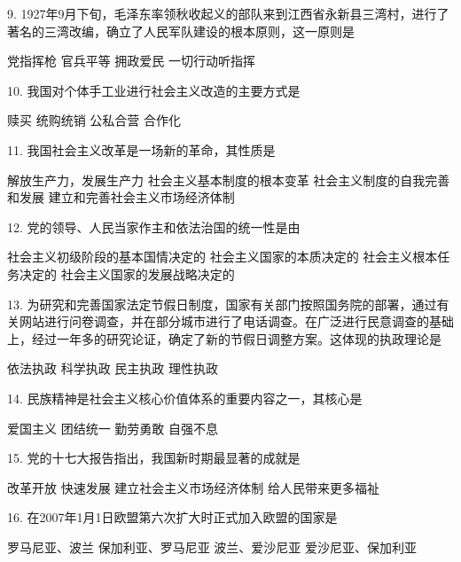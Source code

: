 9. 1927年9月下旬，毛泽东率领秋收起义的部队来到江西省永新县三湾村，进行了著名的三湾改编，确立了人民军队建设的根本原则，这一原则是
\begin{choices}
	 党指挥枪
	 官兵平等
	 拥政爱民
	 一切行动听指挥
\end{choices}
10. 我国对个体手工业进行社会主义改造的主要方式是
\begin{choices}
	 赎买
	 统购统销
	 公私合营
	 合作化
\end{choices}
11. 我国社会主义改革是一场新的革命，其性质是
\begin{choices}
	 解放生产力，发展生产力
	 社会主义基本制度的根本变革
	 社会主义制度的自我完善和发展
	 建立和完善社会主义市场经济体制
\end{choices}
12. 党的领导、人民当家作主和依法治国的统一性是由
\begin{choices}
	 社会主义初级阶段的基本国情决定的
	 社会主义国家的本质决定的
	 社会主义根本任务决定的
	 社会主义国家的发展战略决定的
\end{choices}
13. 为研究和完善国家法定节假日制度，国家有关部门按照国务院的部署，通过有关网站进行问卷调查，并在部分城市进行了电话调查。在广泛进行民意调查的基础上，经过一年多的研究论证，确定了新的节假日调整方案。这体现的执政理论是
\begin{choices}
	 依法执政
	 科学执政
	 民主执政
	 理性执政
\end{choices}
14. 民族精神是社会主义核心价值体系的重要内容之一，其核心是
\begin{choices}
	 爱国主义
	 团结统一
	 勤劳勇敢
	 自强不息
\end{choices}
15. 党的十七大报告指出，我国新时期最显著的成就是
\begin{choices}
	 改革开放
	 快速发展
	 建立社会主义市场经济体制
	 给人民带来更多福祉
\end{choices}
16. 在2007年1月1日欧盟第六次扩大时正式加入欧盟的国家是
\begin{choices}
	 罗马尼亚、波兰
	 保加利亚、罗马尼亚
	 波兰、爱沙尼亚
	 爱沙尼亚、保加利亚
\end{choices}
\vspace{6pt}
